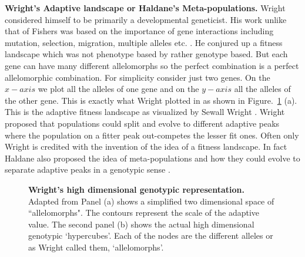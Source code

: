 \documentclass[oneside,11pt,a4paper]{book}
\begin{document}
\textbf{Wright's Adaptive landscape or Haldane's Meta-populations.}
Wright considered himself to be primarily a developmental geneticist.
His work unlike that of Fishers was based on the importance of gene interactions \citep{mayr:1980bo} including mutation, selection, migration, multiple alleles etc. \citep{wright:1931ge}.
He conjured up a fitness landscape which was not phenotype based by rather genotype based.
But each gene can have many different allelomorphs so the perfect combination is a perfect allelomorphic combination.
For simplicity consider just two genes.
On the $x-axis$ we plot all the alleles of one gene and on the $y-axis$ all the alleles of the other gene.
This is exactly what Wright plotted in \citep{wright:1932aa} as shown in Figure.\ \ref{wrightland} (a).
This is the adaptive fitness landscape as visualized by Sewall Wright \citep{wright:1932aa,gavrilets:2004bo}.
Wright proposed that populations could split and evolve to different adaptive peaks where the population on a fitter peak out-competes the lesser fit ones.
Often only Wright is credited with the invention of the idea of a fitness landscape.
In fact Haldane also proposed the idea of meta-populations and how they could evolve to separate adaptive peaks in a genotypic sense \citep{haldane:1932aa}.
%
\begin{figure}[h]
\begin{center}
\caption{\textbf{Wright's high dimensional genotypic representation.}
\small{Adapted from \citet{wright:1932aa} 
Panel (a) shows a simplified two dimensional space of ``allelomorphs".
The contours represent the scale of the adaptive value.
The second panel (b) shows the actual high dimensional genotypic `hypercubes'.
Each of the nodes are the different alleles or as Wright called them, `allelomorphs'.}
}
\label{wrightland}
\end{center}
\end{figure}
%
\end{document}
